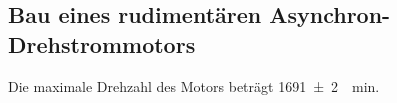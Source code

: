 \documentclass[12pt,english,ngerman]{scrartcl}
\begin{document}
\subsection{Bau eines rudimentären Asynchron-Drehstrommotors}

Die maximale Drehzahl des Motors beträgt \SI{1691(2)}{\per\minute}.

\newpage

\printbibliography
\listoffigures
\listoftables
\end{document}
